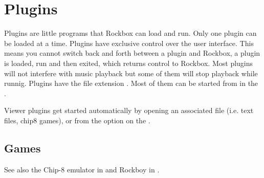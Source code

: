 \chapter{Plugins}\label{ref:plugins}
Plugins are little programs that Rockbox can load and run. Only one plugin can
be loaded at a time. Plugins have exclusive control over the user interface.
This means you cannot switch back and forth between a plugin and Rockbox, a
plugin is loaded, run and then exited, which returns control to Rockbox. Most
plugins will not interfere with music playback but some of them will stop
playback while runnig. Plugins have the file extension . Most of
them can be started from  in the .

Viewer plugins get started automatically by opening an associated file (i.e.
text files, chip8 games), or from the  option on the
.

\section{Games}
    {See also the Chip{}-8 emulator in 
    {and Rockboy in }.}














